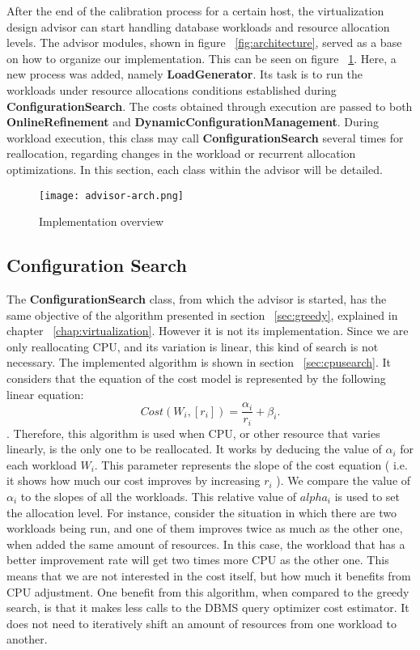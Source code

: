 After the end of the calibration process for a certain host, the virtualization design advisor can start handling database workloads and resource allocation levels. The advisor modules, shown in figure ~\ref{fig:architecture}, served as a base on how to organize our implementation. This can be seen on figure ~\ref{fig:advisor}. Here, a new process was added, namely \textbf{LoadGenerator}.  Its task is to run the workloads under resource allocations conditions established during \textbf{ConfigurationSearch}. The costs obtained through execution are passed to both \textbf{OnlineRefinement} and \textbf{DynamicConfigurationManagement}. During workload execution, this class may call \textbf{ConfigurationSearch} several times for reallocation, regarding changes in the workload or recurrent allocation optimizations. In this section, each class within the advisor will be detailed.


\begin{figure}[ht]
\centering
\texttt{[image: advisor-arch.png]}
\caption{Implementation overview}
\label{fig:advisor}
\end{figure} 

\subsection{Configuration Search}

The \textbf{ConfigurationSearch} class, from which the advisor is started,  has the same objective of the algorithm presented in section ~\ref{sec:greedy}, explained in chapter  ~\ref{chap:virtualization}. However it is not its implementation. Since we are only reallocating CPU, and its variation is linear, this kind of search is not necessary. The implemented algorithm is shown in section ~\ref{sec:cpusearch}. It considers that the equation of the cost model is represented by the following linear equation:
\[
 Cost(W_{i}, [r_{i}]) = \frac{\alpha_{i}}{r_{i}} +\beta_{i}.
\].
Therefore, this algorithm is used when CPU, or other resource that varies linearly, is the only one to be reallocated. It works by deducing the value of $\alpha_{i}$ for each workload $W_{i}$. This parameter represents the slope of the cost equation ( i.e. it shows how much our cost improves by increasing $r_{i}$ ). We compare the  value of $\alpha_{i}$ to the slopes of all the workloads. This relative value of $alpha_{i}$ is used to set the allocation level. For instance, consider the situation in which there are two workloads being run, and one of them improves twice as much as the other one, when added the same amount of resources. In this case, the workload that has a better improvement rate will get two times more CPU as the other one. This means that we are not interested in the cost itself, but how much it benefits from CPU adjustment. One benefit from this algorithm, when compared to the greedy search, is that it makes less calls to the DBMS query optimizer cost estimator. It does not need to iteratively shift an amount of resources from one workload to another.



